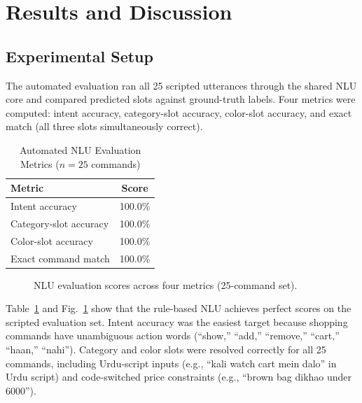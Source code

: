 \documentclass[conference]{IEEEtran}
\begin{document}
\section{Results and Discussion}

\subsection{Experimental Setup}

The automated evaluation ran all 25 scripted utterances through the
shared NLU core and compared predicted slots against ground-truth
labels. Four metrics were computed: intent accuracy, category-slot
accuracy, color-slot accuracy, and exact match (all three slots
simultaneously correct).

\begin{table}[t]
\caption{Automated NLU Evaluation Metrics ($n=25$ commands)}
\label{tab:metrics}
\centering
\renewcommand{\arraystretch}{1.1}
\begin{tabular}{lc}
\toprule
\textbf{Metric} & \textbf{Score} \\
\midrule
Intent accuracy        & 100.0\% \\
Category-slot accuracy & 100.0\% \\
Color-slot accuracy    & 100.0\% \\
Exact command match    & 100.0\% \\
\bottomrule
\end{tabular}
\end{table}

\begin{figure}[t]
\centering

\caption{NLU evaluation scores across four metrics (25-command set).}
\label{fig:accuracy}
\end{figure}

Table~\ref{tab:metrics} and Fig.~\ref{fig:accuracy} show that the
rule-based NLU achieves perfect scores on the scripted evaluation set.
Intent accuracy was the easiest target because shopping commands have
unambiguous action words (``show,'' ``add,'' ``remove,'' ``cart,''
``haan,'' ``nahi''). Category and color slots were resolved correctly
for all 25 commands, including Urdu-script inputs
(e.g., ``kali watch cart mein dalo'' in Urdu script) and code-switched
price constraints (e.g., ``brown bag dikhao under 6000'').
\end{document}
